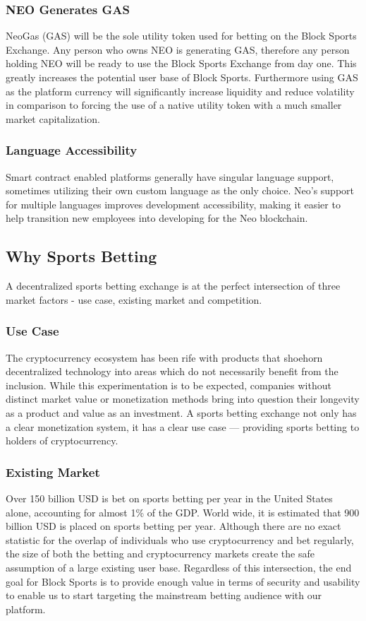 \documentclass{article}
\begin{document}
		\subsubsection{NEO Generates GAS}
NeoGas (GAS) will be the sole utility token used for betting on the Block Sports Exchange. Any person who owns NEO is generating GAS, therefore any person holding NEO will be ready to use the Block Sports Exchange from day one. This greatly increases the potential user base of Block Sports. Furthermore using GAS as the platform currency will significantly increase liquidity and reduce volatility in comparison to forcing the use of a native utility token with a much smaller market capitalization.

		\subsubsection{Language Accessibility}
Smart contract enabled platforms generally have singular language support, sometimes utilizing their own custom language as the only choice. Neo’s support for multiple languages improves development accessibility, making it easier to help transition new employees into developing for the Neo blockchain.

	\subsection{Why Sports Betting}
A decentralized sports betting exchange is at the perfect intersection of three market factors - use case, existing market and competition.

		\subsubsection{Use Case}
The cryptocurrency ecosystem has been rife with products that shoehorn decentralized technology into areas which do not necessarily benefit from the inclusion. While this experimentation is to be expected, companies without distinct market value or monetization methods bring into question their longevity as a product and value as an investment. A sports betting exchange not only has a clear monetization system, it has a clear use case --- providing sports betting to holders of cryptocurrency.


		\subsubsection{Existing Market}
Over 150 billion USD is bet on sports betting per year in the United States alone, accounting for almost 1\% of the GDP. World wide, it is estimated that 900 billion USD is placed on sports betting per year. Although there are no exact statistic for the overlap of individuals who use cryptocurrency and bet regularly, the size of both the betting and cryptocurrency markets create the safe assumption of a large existing user base. Regardless of this intersection, the end goal for Block Sports is to provide enough value in terms of security and usability to enable us to start targeting the mainstream betting audience with our platform.
\end{document}
